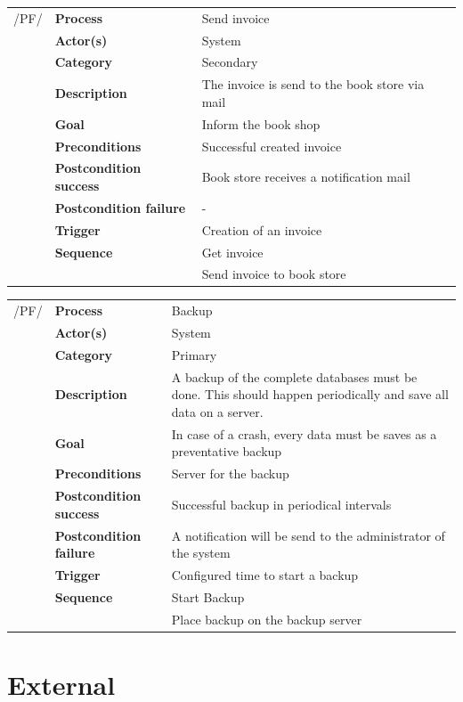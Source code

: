 \documentclass[11pt,a4paper,oneside,svgnames]{report}
\begin{document}
\noindent
\begin{tabular}{p{1.5cm}p{3cm}p{8cm}}
/PF/	& \textbf{Process} & Send invoice\\
		& \textbf{Actor(s)} & System\\
		& \textbf{Category} & Secondary\\
		& \textbf{Description}	 & The invoice is send to the book store via mail\\
		& \textbf{Goal} & Inform the book shop\\
		& \textbf{Preconditions} & Successful created invoice\\
		& \textbf{Postcondition success} & Book store receives a notification mail\\
		& \textbf{Postcondition failure} & -\\
		& \textbf{Trigger} & Creation of an invoice\\
		& \textbf{Sequence} & Get invoice\\
		& & Send invoice to book store
		
\hfill \\
\end{tabular}

\noindent
\begin{tabular}{p{1.5cm}p{3cm}p{8cm}}
/PF/	& \textbf{Process} & Backup\\
		& \textbf{Actor(s)} & System\\
		& \textbf{Category} & Primary\\
		& \textbf{Description}	 & A backup of the complete databases must be done. This should happen periodically and save all data on a server.\\
		& \textbf{Goal} & In case of a crash, every data must be saves as a preventative backup\\
		& \textbf{Preconditions} & Server for the backup\\
		& \textbf{Postcondition success} & Successful backup in periodical intervals\\
		& \textbf{Postcondition failure} & A notification will be send to the administrator of the system\\
		& \textbf{Trigger} & Configured time to start a backup\\
		& \textbf{Sequence} & Start Backup\\
		& & Place backup on the backup server
		
\hfill \\
\end{tabular}

\section{External}
\end{document}
